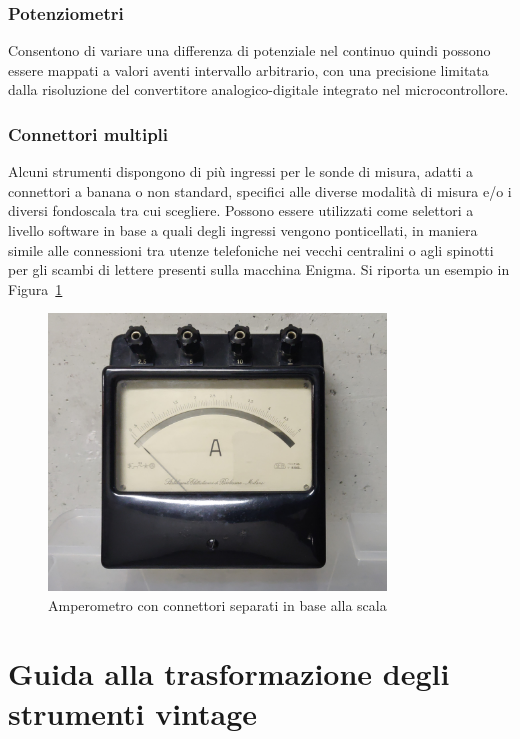 \documentclass[12pt,a4paper]{report}
\begin{document}
\subsection{Potenziometri}
Consentono di variare una differenza di potenziale nel continuo quindi possono essere mappati a valori aventi intervallo arbitrario, con una precisione limitata dalla risoluzione del convertitore analogico-digitale integrato nel microcontrollore.

\subsection{Connettori multipli}
Alcuni strumenti dispongono di più ingressi per le sonde di misura, adatti a connettori a banana o non standard, specifici alle
diverse modalità di misura e/o i diversi fondoscala tra cui scegliere. Possono essere utilizzati come selettori a livello software in base a
quali degli ingressi vengono ponticellati, in maniera simile alle connessioni tra utenze telefoniche nei vecchi centralini o agli spinotti per
gli scambi di lettere presenti sulla macchina Enigma. Si riporta un esempio in Figura~\ref{fig:connettorimultipli}

\begin{figure}[h]
  \centering
  \includegraphics[width=0.8\textwidth]{connettorimultipli}
  \caption{Amperometro con connettori separati in base alla scala}
  \label{fig:connettorimultipli}
\end{figure}


\chapter{Guida alla trasformazione degli strumenti vintage}
\end{document}
